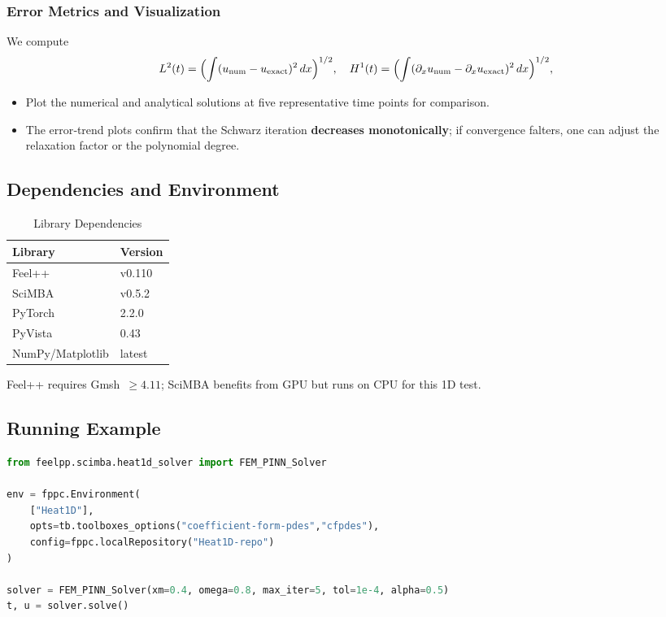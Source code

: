 \documentclass[12pt]{article}
\begin{document}
\subsubsection{Error Metrics and Visualization}

We compute
\begin{equation}
  L^2(t) = \Bigl(\int(u_{\rm num}-u_{\rm exact})^2\,dx\Bigr)^{1/2},\quad
  H^1(t) = \Bigl(\int(\partial_xu_{\rm num}-\partial_xu_{\rm exact})^2\,dx\Bigr)^{1/2},
\end{equation}

\begin{itemize}
  \item Plot the numerical and analytical solutions at five representative time points for comparison.
  \item The error‐trend plots confirm that the Schwarz iteration \textbf{decreases monotonically}; if convergence falters, one can adjust the relaxation factor or the polynomial degree.
\end{itemize}

\subsection{Dependencies and Environment}

\begin{table}[htbp]
\centering
\caption{Library Dependencies}
\label{tab:deps}
\begin{tabular}{ll}
\toprule
Library           & Version \\ \midrule
Feel++            & v0.110  \\
SciMBA            & v0.5.2  \\
PyTorch           & 2.2.0   \\
PyVista           & 0.43    \\
NumPy/Matplotlib  & latest  \\
\bottomrule
\end{tabular}
\end{table}

\noindent
Feel++ requires Gmsh~\(\ge4.11\); SciMBA benefits from GPU but runs on CPU for this 1D test.

\subsection{Running Example}

\begin{lstlisting}[language=Python]
from feelpp.scimba.heat1d_solver import FEM_PINN_Solver

env = fppc.Environment(
    ["Heat1D"],
    opts=tb.toolboxes_options("coefficient-form-pdes","cfpdes"),
    config=fppc.localRepository("Heat1D-repo")
)

solver = FEM_PINN_Solver(xm=0.4, omega=0.8, max_iter=5, tol=1e-4, alpha=0.5)
t, u = solver.solve()
\end{lstlisting}
\end{document}
